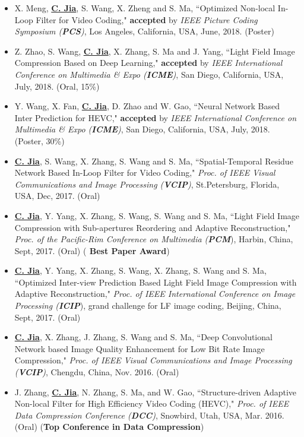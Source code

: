 \documentclass[margin, 10pt]{res} %
\begin{document}
\begin{resume}
\begin{itemize}
\item{X. Meng, \underline{\bf C. Jia}, S. Wang, X. Zheng and S. Ma, ``Optimized Non-local In-Loop Filter for Video Coding," {\bf accepted} by {\em IEEE Picture Coding Symposium ({\bf PCS})}, Los Angeles, California, USA, June, 2018. (Poster)}

\item{Z. Zhao, S. Wang, \underline{\bf C. Jia}, X. Zhang, S. Ma and J. Yang, ``Light Field Image Compression Based on Deep Learning," {\bf accepted} by {\em IEEE International Conference on Multimedia \& Expo ({\bf ICME})}, San Diego, California, USA, July, 2018. (Oral, 15\%)}

\item{Y. Wang, X. Fan, \underline{\bf C. Jia}, D. Zhao and W. Gao, ``Neural Network Based Inter Prediction for HEVC," {\bf accepted} by {\em IEEE International Conference on Multimedia \& Expo ({\bf ICME})}, San Diego, California, USA, July, 2018. (Poster, 30\%)}

\item{\underline{\bf C. Jia}, S. Wang, X. Zhang, S. Wang and S. Ma, ``Spatial-Temporal Residue Network Based In-Loop Filter for Video Coding," {\em Proc. of IEEE Visual Communications and Image Processing ({\bf VCIP})}, St.Petersburg, Florida, USA, Dec, 2017. (Oral)}

\item{\underline{\bf C. Jia}, Y. Yang, X. Zhang, S. Wang, S. Wang and S. Ma, ``Light Field Image Compression with Sub-apertures Reordering and Adaptive Reconstruction," {\em Proc. of the Pacific-Rim Conference on Multimedia ({\bf PCM}}), Harbin, China, Sept, 2017. (Oral)} ({\bf{\color{red} Best Paper Award}})

\item{\underline{\bf C. Jia}, Y. Yang, X. Zhang, S. Wang, X. Zhang, S. Wang and S. Ma, ``Optimized Inter-view Prediction Based Light Field Image Compression with Adaptive Reconstruction," {\em Proc. of IEEE International Conference on Image Processing ({\bf ICIP}}), grand challenge for LF image coding, Beijing, China, Sept, 2017. (Oral)}

\item{\underline{\bf C. Jia}, X. Zhang, J. Zhang, S. Wang and S. Ma, ``Deep Convolutional Network based Image Quality Enhancement for Low Bit Rate Image Compression," {\em Proc. of IEEE Visual Communications and Image Processing ({\bf VCIP})}, Chengdu, China, Nov. 2016. (Oral)}

\item{J. Zhang, \underline{\bf C. Jia},  N. Zhang, S. Ma, and W. Gao, ``Structure-driven Adaptive Non-local Filter for High Efficiency Video Coding (HEVC)," {\em Proc. of IEEE Data Compression Conference ({\bf DCC})}, Snowbird, Utah, USA, Mar. 2016. (Oral) ({\bf Top Conference in Data Compression})}


\end{itemize}
\end{resume}
\end{document}
